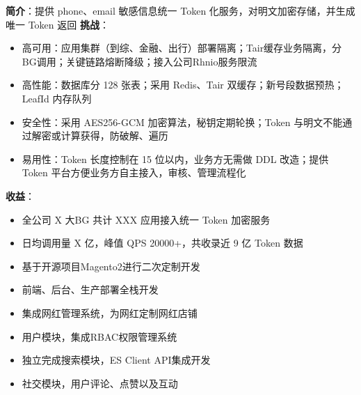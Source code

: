 \documentclass{resume}
\begin{document}
    \begin{onehalfspacing}
        \textbf{简介}：提供 phone、email 敏感信息统一 Token 化服务，对明文加密存储，并生成唯一 Token 返回\newline
        \textbf{挑战}：
        \begin{itemize}
            \item 高可用：应用集群（到综、金融、出行）部署隔离；Tair缓存业务隔离，分BG调用；关键链路熔断降级；接入公司Rhnio服务限流
            \item 高性能：数据库分 128 张表；采用 Redis、Tair 双缓存；新号段数据预热；LeafId 内存队列
            \item 安全性：采用 AES256-GCM 加密算法，秘钥定期轮换；Token 与明文不能通过解密或计算获得，防破解、遍历
            \item 易用性：Token 长度控制在 15 位以内，业务方无需做 DDL 改造；提供 Token 平台方便业务方自主接入，审核、管理流程化
        \end{itemize}
        \textbf{收益}：
        \begin{itemize}
            \item 全公司 X 大BG 共计 XXX 应用接入统一 Token 加密服务
            \item 日均调用量 X 亿，峰值 QPS 20000+，共收录近 9 亿 Token 数据
        \end{itemize}
    \end{onehalfspacing}
    \hwj{ }

    \begin{onehalfspacing}
        \begin{itemize}
            \item 基于开源项目Magento2进行二次定制开发
            \item 前端、后台、生产部署全栈开发
            \item 集成网红管理系统，为网红定制网红店铺
        \end{itemize}
    \end{onehalfspacing}
    \hwj{ }

    \begin{onehalfspacing}
        \begin{itemize}
            \item 用户模块，集成RBAC权限管理系统
            \item 独立完成搜索模块，ES Client API集成开发
            \item 社交模块，用户评论、点赞以及互动
        \end{itemize}
    \end{onehalfspacing}
    \hwj{ }
\end{document}
